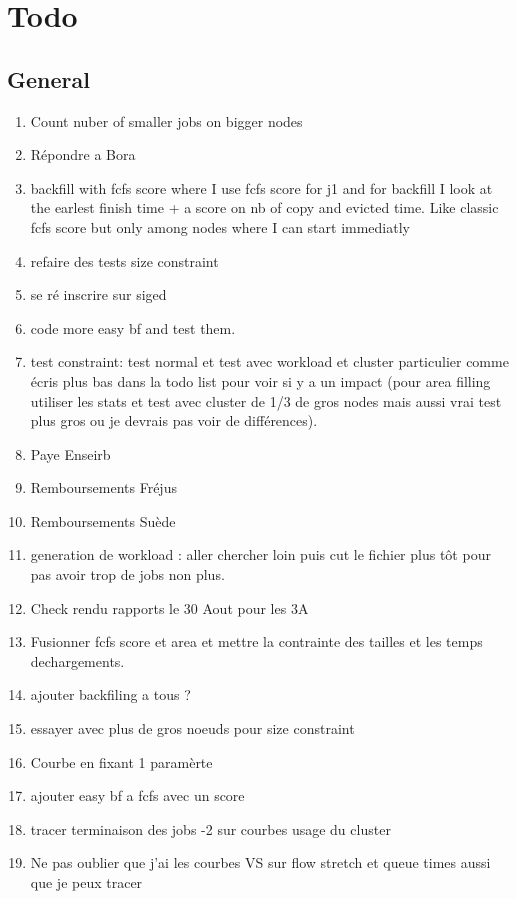 \documentclass[a4paper]{article}
\begin{document}
\section{Todo}
	\subsection{General}
		\begin{enumerate}
			\item Count nuber of smaller jobs on bigger nodes
			\item Répondre a Bora
			\item backfill with fcfs score where I use fcfs score for j1 and for backfill I look at the earlest finish time + a score on nb of copy and evicted time. Like classic fcfs score but only among nodes where I can start immediatly
			\item refaire des tests size constraint
			\item se ré inscrire sur siged
			\item code more easy bf and test them.
			\item test constraint: test normal et test avec workload et cluster particulier comme écris plus bas dans la todo list pour voir si y a un impact (pour area filling utiliser les stats et test avec cluster de 1/3 de gros nodes mais aussi vrai test plus gros ou je devrais pas voir de différences).
			\item Paye Enseirb
			\item Remboursements Fréjus
			\item Remboursements Suède
			\item generation de workload : aller chercher loin puis cut le fichier plus tôt pour pas avoir trop de jobs non plus.
			\item Check rendu rapports le 30 Aout pour les 3A
			\item Fusionner fcfs score et area et mettre la contrainte des tailles et les temps dechargements.
			\item ajouter backfiling a tous ?
			\item essayer avec plus de gros noeuds pour size constraint
			\item Courbe en fixant 1 paramèrte
			\item ajouter easy bf a fcfs avec un score						
			\item tracer terminaison des jobs -2 sur courbes usage du cluster
			\item Ne pas oublier que j'ai les courbes VS sur flow stretch et queue times aussi que je peux tracer						

\end{enumerate}
\end{document}
